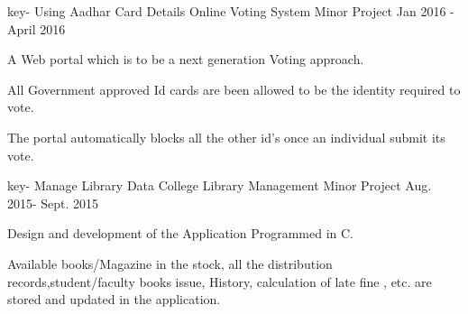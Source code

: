 \begin{cventries}
  \cventry
    {key- Using Aadhar Card Details}
    {Online Voting System}
    {Minor Project }
    {Jan 2016 - April 2016}
    {
      \begin{cvitems}
        \item {A Web portal which is to be a next generation Voting approach.}
        \item {All Government approved Id cards are been allowed to be the identity required to  vote.}
        \item {The portal automatically blocks all the other id's once an individual submit its vote.}
      \end{cvitems}
    }
    \cventry
    {key- Manage Library Data}
    {College Library Management}
    {Minor Project }
    {Aug. 2015- Sept. 2015}
    {
      \begin{cvitems}
        \item {Design and development of the Application Programmed in C.}
        \item {Available books/Magazine in the stock, all the distribution records,student/faculty books issue, History, calculation of late fine , etc. are stored and updated in the application.}
      \end{cvitems}
    }
\end{cventries}
